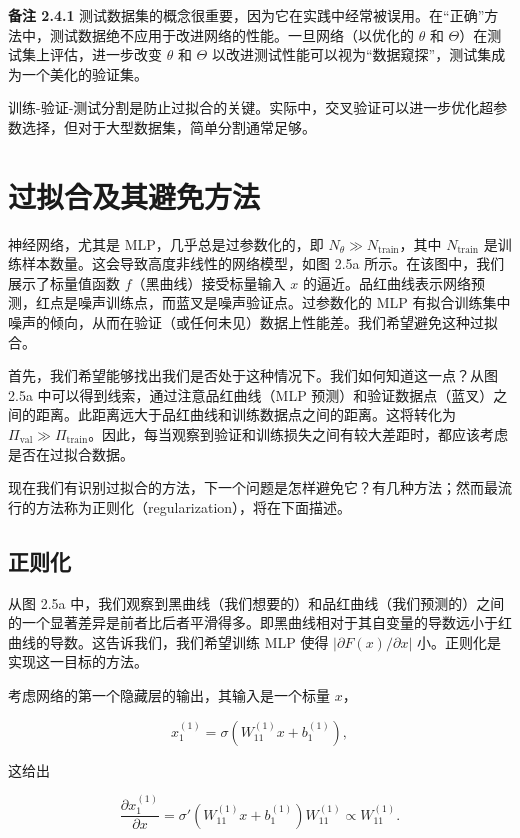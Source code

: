 \textbf{备注 2.4.1} 测试数据集的概念很重要，因为它在实践中经常被误用。在“正确”方法中，测试数据绝不应用于改进网络的性能。一旦网络（以优化的 $\theta$ 和 $\Theta$）在测试集上评估，进一步改变 $\theta$ 和 $\Theta$ 以改进测试性能可以视为“数据窥探”，测试集成为一个美化的验证集。

\begin{mycomment}
训练-验证-测试分割是防止过拟合的关键。实际中，交叉验证可以进一步优化超参数选择，但对于大型数据集，简单分割通常足够。
\end{mycomment}

\section{过拟合及其避免方法}

神经网络，尤其是 MLP，几乎总是过参数化的，即 $N_\theta \gg N_{\text{train}}$，其中 $N_{\text{train}}$ 是训练样本数量。这会导致高度非线性的网络模型，如图 2.5a 所示。在该图中，我们展示了标量值函数 $f$（黑曲线）接受标量输入 $x$ 的逼近。品红曲线表示网络预测，红点是噪声训练点，而蓝叉是噪声验证点。过参数化的 MLP 有拟合训练集中噪声的倾向，从而在验证（或任何未见）数据上性能差。我们希望避免这种过拟合。

首先，我们希望能够找出我们是否处于这种情况下。我们如何知道这一点？从图 2.5a 中可以得到线索，通过注意品红曲线（MLP 预测）和验证数据点（蓝叉）之间的距离。此距离远大于品红曲线和训练数据点之间的距离。这将转化为 $\Pi_{\text{val}} \gg \Pi_{\text{train}}$。因此，每当观察到验证和训练损失之间有较大差距时，都应该考虑是否在过拟合数据。

现在我们有识别过拟合的方法，下一个问题是怎样避免它？有几种方法；然而最流行的方法称为正则化（regularization），将在下面描述。

\subsection{正则化}

从图 2.5a 中，我们观察到黑曲线（我们想要的）和品红曲线（我们预测的）之间的一个显著差异是前者比后者平滑得多。即黑曲线相对于其自变量的导数远小于红曲线的导数。这告诉我们，我们希望训练 MLP 使得 $| \partial F(x) / \partial x |$ 小。正则化是实现这一目标的方法。

考虑网络的第一个隐藏层的输出，其输入是一个标量 $x$，

\[
x^{(1)}_1 = \sigma( W^{(1)}_{11} x + b^{(1)}_1 ),
\]

这给出

\[
\frac{\partial x^{(1)}_1}{\partial x} = \sigma'( W^{(1)}_{11} x + b^{(1)}_1 ) W^{(1)}_{11} \propto W^{(1)}_{11}.
\]

